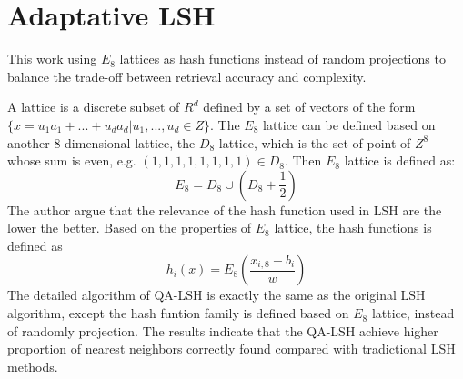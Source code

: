 \section{Adaptative LSH}
This work \cite{jegou2008query} using $E_8$ lattices as hash functions instead of random projections to balance the trade-off between retrieval accuracy and complexity.

A lattice is a discrete subset of $R^d$ defined by a set of vectors of the form $\{x=u_1a_1+...+u_da_d|u_1, ..., u_d\in Z\}$. The $E_8$ lattice can be defined based on another 8-dimensional lattice, the $D_8$ lattice, which is the set of point of $Z^8$ whose sum is even, e.g. $(1,1,1,1,1,1,1,1)\in D_8$. Then $E_8$ lattice is defined as:
$$E_8=D_8\cup (D_8+\frac{1}{2})$$
The author argue that the relevance of the hash function used in LSH are the lower the better. Based on the properties of $E_8$ lattice, the hash functions is defined as $$h_i(x)=E_8(\frac{x_{i,8}-b_i}{w})$$ The detailed algorithm of QA-LSH is exactly the same as the original LSH algorithm, except the hash funtion family is defined based on $E_8$ lattice, instead of randomly projection. The results indicate that the QA-LSH achieve higher proportion of nearest neighbors correctly found compared with tradictional LSH methods. 
